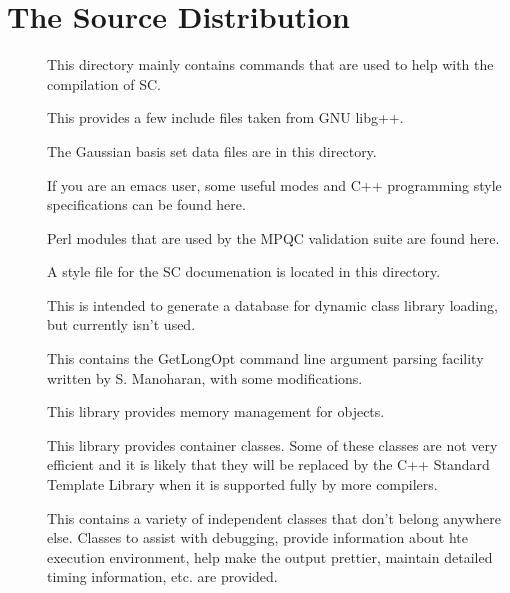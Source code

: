 \documentclass{report}
\begin{document}
\chapter{The Source Distribution}

\begin{description}
\item[]  This directory mainly contains commands that
  are used to help with the compilation of SC.

\item[]  This provides a few include
  files taken from GNU libg++.

\item[] The Gaussian basis set data files are in this
  directory.

\item[] If you are an emacs user, some useful
  modes and C++ programming style specifications can be found
  here.

\item[] Perl modules that are used by the MPQC
  validation suite are found here.

\item[] A style file for the SC documenation
  is located in this directory.
  
\item[]  This is intended to generate a
  database for dynamic class library loading, but currently isn't used.

\item[]
  This contains the GetLongOpt command line argument parsing facility
  written by S. Manoharan, with some modifications.

\item[]
  This library provides memory management for objects.

\item[] This library provides container
  classes.  Some of these classes are not very efficient and it is likely
  that they will be replaced by the C++ Standard Template Library when it
  is supported fully by more compilers.

\item[] This contains a variety of independent
  classes that don't belong anywhere else.  Classes to assist with
  debugging, provide information about hte execution environment, help make
  the output prettier, maintain detailed timing information, etc. are
  provided.


\end{description}
\end{document}
